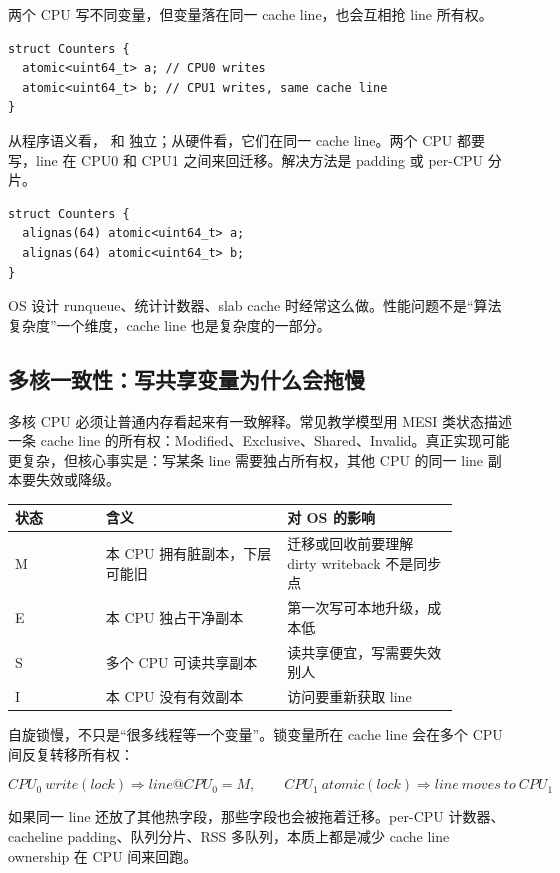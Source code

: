 两个 CPU 写不同变量，但变量落在同一 cache line，也会互相抢 line 所有权。

\begin{lstlisting}
struct Counters {
  atomic<uint64_t> a; // CPU0 writes
  atomic<uint64_t> b; // CPU1 writes, same cache line
}
\end{lstlisting}

从程序语义看， 和  独立；从硬件看，它们在同一 cache line。两个 CPU 都要写，line 在 CPU0 和 CPU1 之间来回迁移。解决方法是 padding 或 per-CPU 分片。

\begin{lstlisting}
struct Counters {
  alignas(64) atomic<uint64_t> a;
  alignas(64) atomic<uint64_t> b;
}
\end{lstlisting}

OS 设计 runqueue、统计计数器、slab cache 时经常这么做。性能问题不是“算法复杂度”一个维度，cache line 也是复杂度的一部分。

\subsection{多核一致性：写共享变量为什么会拖慢}

多核 CPU 必须让普通内存看起来有一致解释。常见教学模型用 MESI 类状态描述一条 cache line 的所有权：Modified、Exclusive、Shared、Invalid。真正实现可能更复杂，但核心事实是：写某条 line 需要独占所有权，其他 CPU 的同一 line 副本要失效或降级。

\begin{longtable}{p{0.18\linewidth}p{0.36\linewidth}p{0.34\linewidth}}
\toprule
状态 & 含义 & 对 OS 的影响 \\
\midrule
M & 本 CPU 拥有脏副本，下层可能旧 & 迁移或回收前要理解 dirty writeback 不是同步点 \\
E & 本 CPU 独占干净副本 & 第一次写可本地升级，成本低 \\
S & 多个 CPU 可读共享副本 & 读共享便宜，写需要失效别人 \\
I & 本 CPU 没有有效副本 & 访问要重新获取 line \\
\bottomrule
\end{longtable}

自旋锁慢，不只是“很多线程等一个变量”。锁变量所在 cache line 会在多个 CPU 间反复转移所有权：

\[
CPU_0\ write(lock) \Rightarrow line@CPU_0=M,\qquad
CPU_1\ atomic(lock) \Rightarrow line\ moves\ to\ CPU_1
\]

如果同一 line 还放了其他热字段，那些字段也会被拖着迁移。per-CPU 计数器、cacheline padding、队列分片、RSS 多队列，本质上都是减少 cache line ownership 在 CPU 间来回跑。

